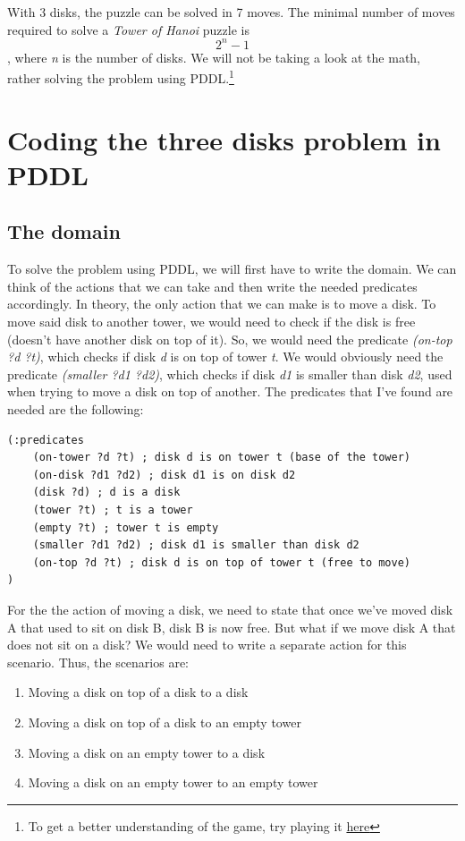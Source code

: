 \documentclass{article}
\begin{document}
\noindent
With 3 disks, the puzzle can be solved in 7 moves. The minimal number of moves required to solve a \emph{Tower of Hanoi} puzzle is \[2^n-1\], where \emph{n} is the number of disks. We will not be taking a look at the math, rather solving the problem using PDDL.\footnote{To get a better understanding of the game, try playing it \href{https://www.mathsisfun.com/games/towerofhanoi.html}{here}}

\section{Coding the three disks problem in PDDL}

\subsection{The domain}

To solve the problem using PDDL, we will first have to write the domain. We can think of the actions that we can take and then write the needed predicates accordingly. In theory, the only action that we can make is to move a disk. To move said disk to another tower, we would need to check if the disk is free (doesn't have another disk on top of it). So, we would need the predicate \emph{(on-top ?d ?t)}, which checks if disk \emph{d} is on top of tower \emph{t}. We would obviously need the predicate \emph{(smaller ?d1 ?d2)}, which checks if disk \emph{d1} is smaller than disk \emph{d2}, used when trying to move a disk on top of another. The predicates that I've found are needed are the following:

\begin{lstlisting}
(:predicates 
    (on-tower ?d ?t) ; disk d is on tower t (base of the tower)
    (on-disk ?d1 ?d2) ; disk d1 is on disk d2
    (disk ?d) ; d is a disk
    (tower ?t) ; t is a tower
    (empty ?t) ; tower t is empty
    (smaller ?d1 ?d2) ; disk d1 is smaller than disk d2
    (on-top ?d ?t) ; disk d is on top of tower t (free to move)
)
\end{lstlisting}

\noindent
For the the action of moving a disk, we need to state that once we've moved disk A that used to sit on disk B, disk B is now free. But what if we move disk A that does not sit on a disk? We would need to write a separate action for this scenario. Thus, the scenarios are:

\begin{enumerate}
    \item Moving a disk on top of a disk to a disk
    \item Moving a disk on top of a disk to an empty tower
    \item Moving a disk on an empty tower to a disk
    \item Moving a disk on an empty tower to an empty tower
\end{enumerate}
\end{document}
